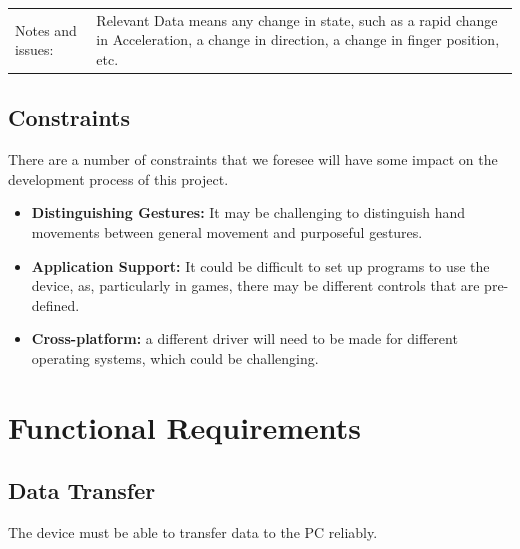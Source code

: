 \documentclass[12pt,a4paper,oneside]{book}
\theoremstyle{plain}
\numberwithin{equation}{chapter}
\newcounter{Chapnum}
\newcounter{Secnum}
\begin{document}
\begin{longtable}{| p{3cm} | p{12cm} |}
\\

\hline
Notes and issues: &
Relevant Data means any change in state, such as a rapid change in Acceleration, a change in direction, a change
in finger position, etc.
\\

\end{longtable}

\newpage

\section{Constraints}

\noindent There are a number of constraints that we foresee will have some impact on the development process of this project.

\begin{itemize}
    \item \textbf{Distinguishing Gestures:} It may be challenging to distinguish hand movements between general movement and purposeful gestures.
    \item \textbf{Application Support:} It could be difficult to set up programs to use the device, as, particularly in games, there may be different controls that are pre-defined.
    \item \textbf{Cross-platform:} a different driver will need to be made for different operating systems, which could be challenging.
\end{itemize}

\chapter*{Functional Requirements}



\section{\textbf{Data Transfer}}

\noindent The device must be able to transfer data to the PC reliably.
\end{document}
